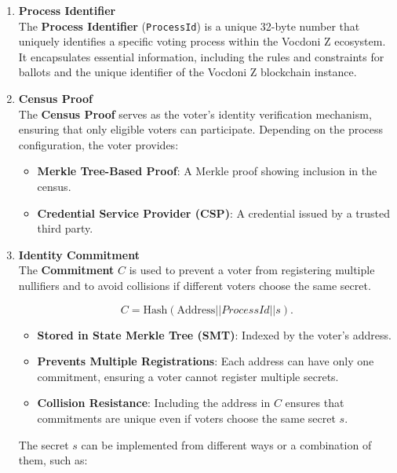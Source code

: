 \begin{enumerate}
	\item \textbf{Process Identifier} \\
	
	The \textbf{Process Identifier} (\texttt{ProcessId}) is a unique 32-byte number that uniquely identifies a specific voting process within the Vocdoni Z ecosystem. It encapsulates essential information, including the rules and constraints for ballots and the unique identifier of the Vocdoni Z blockchain instance.\\
	
	\item \textbf{Census Proof} \\
	
	The \textbf{Census Proof} serves as the voter's identity verification mechanism, ensuring that only eligible voters can participate. Depending on the process configuration, the voter provides:
	\begin{itemize}
		\item \textbf{Merkle Tree-Based Proof}: A Merkle proof showing inclusion in the census.
		\item \textbf{Credential Service Provider (CSP)}: A credential issued by a trusted third party. \\
	\end{itemize}
	
	\item \textbf{Identity Commitment}\\
	
	The \textbf{Commitment} $C$ is used to prevent a voter from registering multiple nullifiers and to avoid collisions if different voters choose the same secret.
	
	$$ C = \text{Hash} (\text{Address} || ProcessId || s). $$
	
	\begin{itemize}
		\item \textbf{Stored in State Merkle Tree (SMT)}: Indexed by the voter's address.
		\item \textbf{Prevents Multiple Registrations}: Each address can have only one commitment, ensuring a voter cannot register multiple secrets.
		\item \textbf{Collision Resistance}: Including the address in $C$ ensures that commitments are unique even if voters choose the same secret $s$.
	\end{itemize}
	
	The secret $s$ can be implemented from different ways or a combination of them, such as:
	

\end{enumerate}
